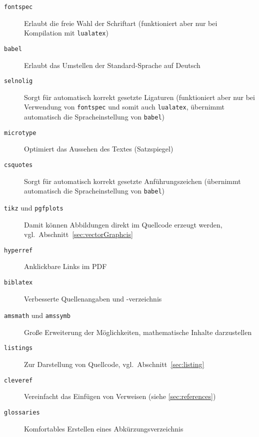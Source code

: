 \begin{description}
  \item[\texttt{fontspec}] Erlaubt die freie Wahl der Schriftart (funktioniert aber nur bei Kompilation mit \texttt{lualatex})
 \item[\texttt{babel}] Erlaubt das Umstellen der Standard-Sprache auf Deutsch
 \item[\texttt{selnolig}] Sorgt für automatisch korrekt gesetzte Ligaturen (funktioniert aber nur bei Verwendung von \texttt{fontspec} und somit auch
 \texttt{lualatex}, übernimmt automatisch die Spracheinstellung von \texttt{babel})
 \item[\texttt{microtype}] Optimiert das Aussehen des Textes (Satzspiegel)
 \item[\texttt{csquotes}] Sorgt für automatisch korrekt gesetzte Anführungszeichen (übernimmt automatisch die Spracheinstellung von \texttt{babel})
 \item[\texttt{tikz} und \texttt{pgfplots}] Damit können Abbildungen direkt im Quellcode erzeugt werden, vgl.\ Abschnitt~\ref{sec:vectorGraphcis}
 \item[\texttt{hyperref}] Anklickbare Links im PDF
 \item[\texttt{biblatex}] Verbesserte Quellenangaben und -verzeichnis
 \item[\texttt{amsmath} und \texttt{amssymb}] Große Erweiterung der Möglichkeiten, mathematische Inhalte darzustellen
 \item[\texttt{listings}] Zur Darstellung von Quellcode, vgl.\ Abschnitt~\ref{sec:listing}
 \item[\texttt{cleveref}] Vereinfacht das Einfügen von Verweisen (siehe \cref{sec:references})
 \item[\texttt{glossaries}] Komfortables Erstellen eines Abkürzungsverzeichnis
\end{description}
